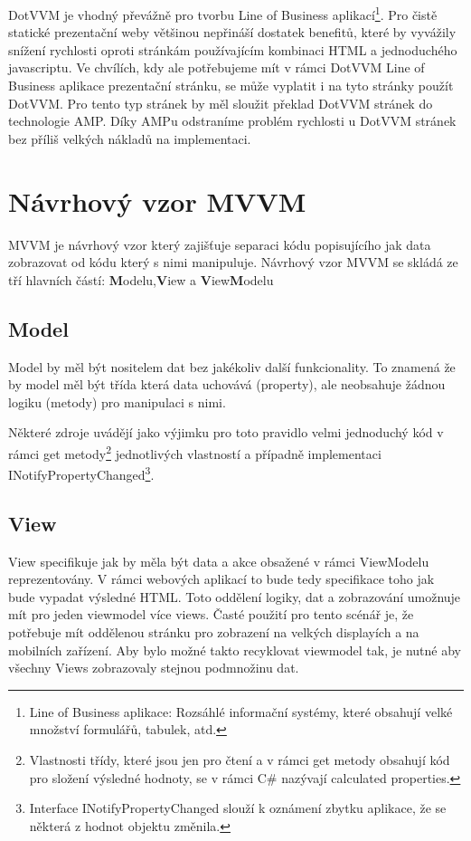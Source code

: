 DotVVM je vhodný převážně pro tvorbu Line of Business aplikací\footnote{Line of Business aplikace: Rozsáhlé informační systémy, které obsahují velké množství formulářů, tabulek, atd.}\cite{DotVVMIntro}. Pro čistě statické prezentační weby většinou nepřináší dostatek benefitů, které by vyvážily snížení rychlosti oproti stránkám používajícím kombinaci HTML a jednoduchého javascriptu. Ve chvílích, kdy ale potřebujeme mít v rámci DotVVM Line of Business aplikace prezentační stránku, se může vyplatit i na tyto stránky použít DotVVM. Pro tento typ stránek by měl sloužit překlad DotVVM stránek do technologie AMP. Díky AMPu odstraníme problém rychlosti u DotVVM stránek bez příliš velkých nákladů na implementaci.

\section{Návrhový vzor MVVM}
MVVM je návrhový vzor který zajišťuje separaci kódu popisujícího jak data zobrazovat od kódu který s nimi manipuluje. Návrhový vzor MVVM se skládá ze tří hlavních částí: \textbf{M}odelu,\textbf{V}iew a \textbf{V}iew\textbf{M}odelu

\subsection*{Model}
Model by měl být nositelem dat bez jakékoliv další funkcionality. To znamená že by model měl být třída která data uchovává (property), ale neobsahuje žádnou logiku (metody) pro manipulaci s nimi.

Některé zdroje uvádějí jako výjimku pro toto pravidlo velmi jednoduchý kód v rámci get metody\footnote{Vlastnosti třídy, které jsou jen pro čtení a v rámci get metody obsahují kód pro složení výsledné hodnoty, se v rámci C# nazývají calculated properties.} jednotlivých vlastností a případně implementaci INotifyPropertyChanged\footnote{Interface INotifyPropertyChanged slouží k oznámení zbytku aplikace, že se některá z hodnot objektu změnila.}.

\subsection*{View}
View specifikuje jak by měla být data a akce obsažené v rámci ViewModelu reprezentovány. V rámci webových aplikací to bude tedy specifikace toho jak bude vypadat výsledné HTML. Toto oddělení logiky, dat a zobrazování umožnuje mít pro jeden viewmodel více views. Časté použití pro tento scénář je, že potřebuje mít oddělenou stránku pro zobrazení na velkých displayích a na mobilních zařízení. Aby bylo možné takto recyklovat viewmodel tak, je nutné aby všechny Views zobrazovaly stejnou podmnožinu dat.
